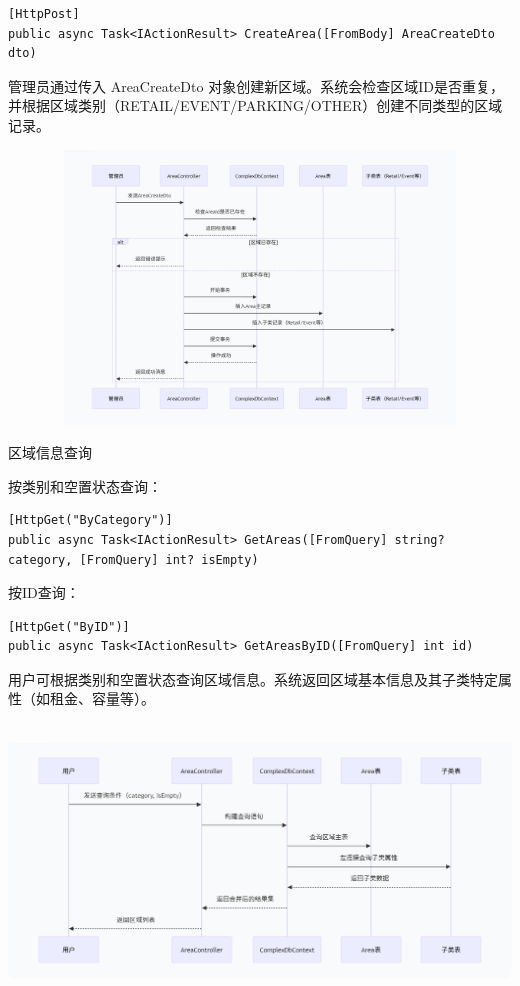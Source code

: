 \documentclass[]{article}
\begin{document}
\begin{verbatim}
[HttpPost]
public async Task<IActionResult> CreateArea([FromBody] AreaCreateDto dto)
\end{verbatim}
管理员通过传入 AreaCreateDto 对象创建新区域。系统会检查区域ID是否重复，并根据区域类别（RETAIL/EVENT/PARKING/OTHER）创建不同类型的区域记录。

\includegraphics[width=5.64167in,height=2.86458in]{media/media/image_2-3-5.png}

区域信息查询

按类别和空置状态查询：
\begin{verbatim}
[HttpGet("ByCategory")]
public async Task<IActionResult> GetAreas([FromQuery] string? category, [FromQuery] int? isEmpty)
\end{verbatim}
按ID查询：
\begin{verbatim}
[HttpGet("ByID")]
public async Task<IActionResult> GetAreasByID([FromQuery] int id)
\end{verbatim}
用户可根据类别和空置状态查询区域信息。系统返回区域基本信息及其子类特定属性（如租金、容量等）。

\includegraphics[width=5.64167in,height=2.86458in]{media/media/image_2-3-6.png}
\end{document}
